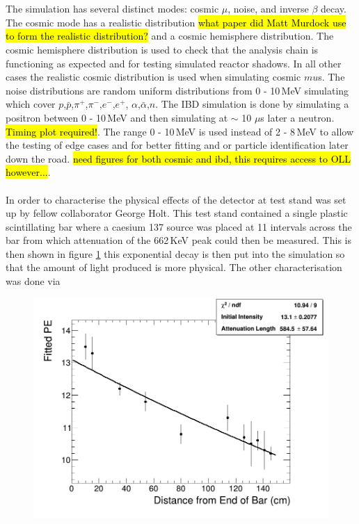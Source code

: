 \documentclass[12pt,a4paper]{article}
\begin{document}
\\\\The simulation has several distinct modes: cosmic $\mu$, noise, and inverse $\beta$ decay. The cosmic mode has a realistic distribution \hl{what paper did Matt Murdock use to form the realistic distribution?} and a cosmic hemisphere distribution. The cosmic hemisphere distribution is used to check that the analysis chain is functioning as expected and for testing simulated reactor shadows. In all other cases the realistic cosmic distribution is used when simulating cosmic $mu$s. The noise distributions are random uniform distributions from 0 - 10\,MeV simulating which cover $p$,$\bar{p}$,$\pi^+$,$\pi^-$,$e^-$,$e^+$, $\alpha$,$\bar{\alpha}$,$n$. The IBD simulation is done by simulating a positron between 0 - 10\,MeV and then simulating at $\sim$ 10 $\mu$s later a neutron. \hl{Timing plot required!}. The range 0 - 10\,MeV is used instead of 2 - 8\,MeV to allow the testing of edge cases and for better fitting and or particle identification later down the road. \hl{need figures for both cosmic and ibd, this requires access to OLL however...}.
\\\\In order to characterise the physical effects of the detector at test stand was set up by fellow collaborator George Holt. This test stand contained a single plastic scintillating bar where a caesium 137 source was placed at 11 intervals across the bar from which attenuation of the 662\,KeV peak could then be measured. This is then shown in figure \ref{fig_attenuationPlot} this exponential decay is then put into the simulation so that the amount of light produced is more physical. The other characterisation was done via 
\begin{figure}[H]
 \centering
 \includegraphics[width=1.0\linewidth]{result_from_attnPlotter.png} 
 \label{fig_attenuationPlot}
\end{figure}
\end{document}
